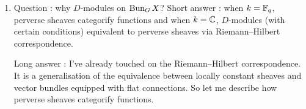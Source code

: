 \documentclass[./main.tex]{subfiles}
\begin{document}
\begin{enumerate}
  Now we show how adeles appear.
  \begin{enumerate}
    \item For a fixed open $U$ of the curve.
    The idea is to replace the cover $U_0, U_1$ by
    $U, \coprod_{x \in X} D_x$ where $D_x$ is the disk around $x \in X(k)$.
    \footnote{
      If anyone asks,
      this works by fpqc descent and the fact that $X$ is finite type.
    }
    One has
    \begin{align*}
      &\set{\text{isomorphism class of line bundles on $X$
      which trivialise on $U$}} \\
      \simeq \,
      & \GL_1(U) \backslash 
      \GL_1(U \cap \coprod_{x \in X} D_x) 
      / \GL_1(\coprod_{x \in X} D_x) \\
      \simeq\,
      & \GL_1(U) \backslash 
      \GL_1 (\prod_{x \in U} \cO_x^\wedge \times \prod_{x \notin U} K^\wedge_x)
      /\GL_1( \prod_{x \in X} \cO_x^\wedge)
    \end{align*}
    \item Now take the union across all opens $U$.
    $\GL_1(U)$ becomes $\GL_1(K)$ \footnote{
      $\GL_1$ separated so maps $\GL_1(U) \subs \GL_1(V)$ for $V \subs U$
    },
    middle term becomes $\GL_1(\bA)$
    and the right hand term $\GL_1(\cO)$
    We obtain what's called the \emph{Weil uniformisation}.
    \[
      \pi_0 \BUN_{\GL_1} X (k) \simeq
      \GL_1(K) \backslash \GL_1(\bA) / \GL_1(\bO_X)
    \]
  \end{enumerate}
  So we see that $\BUN_G$ geometricises the adelic double coset.
  \item Question : why $D$-modules on $\operatorname{Bun}_G X$? 
  Short answer : 
  when $k = \mathbb{F}_q$, 
  perverse sheaves categorify functions
  and when $k = \mathbb{C}$, 
  $D$-modules (with certain conditions) 
  equivalent to perverse sheaves via Riemann--Hilbert correspondence.

  Long answer :
  I've already touched on the Riemann--Hilbert correspondence.
  It is a generalisation of the equivalence between
  locally constant sheaves and
  vector bundles equipped with flat connections.
  So let me describe how perverse sheaves categorify functions.


\end{enumerate}
\end{document}
